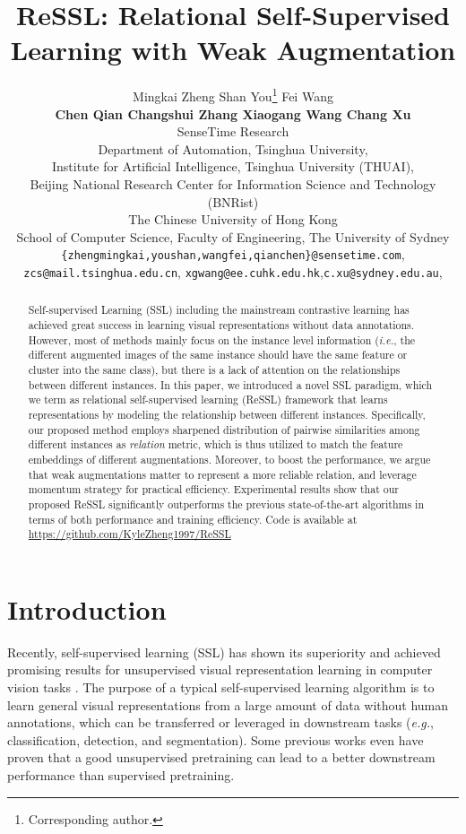 \documentclass{article}
\title{ReSSL: Relational Self-Supervised Learning with Weak Augmentation}
\author{Mingkai Zheng \quad Shan You\thanks{Corresponding author.}  \quad Fei Wang\\
	 \textbf{Chen Qian \quad Changshui Zhang \quad Xiaogang Wang \quad Chang Xu}\\
	SenseTime Research\\
	 Department of Automation, Tsinghua University,\\
Institute for Artificial Intelligence, Tsinghua University (THUAI), \\
Beijing National Research Center for Information Science and Technology (BNRist)\\
	 The Chinese University of Hong Kong\\
	School of Computer Science, Faculty of Engineering, The University of Sydney\\
	 \texttt{\{zhengmingkai,youshan,wangfei,qianchen\}@sensetime.com}, \\
 \texttt{zcs@mail.tsinghua.edu.cn}, \texttt{xgwang@ee.cuhk.edu.hk},\texttt{c.xu@sydney.edu.au},\\ 
	
}
\newcommand{\<}{\left\langle}
\renewcommand{\>}{\right\rangle}
\newcommand{\eg}{{\emph{e.g.}}}
\newcommand{\ie}{{\emph{i.e.}}}
\begin{document}
\maketitle

\vspace{-10pt}
\begin{abstract}
\vspace{-10pt}


Self-supervised Learning (SSL) including the mainstream contrastive learning has achieved great success in learning visual representations without data annotations. However, most of methods mainly focus on the instance level information (\ie, the different augmented images of the same instance should have the same feature or cluster into the same class), but there is a lack of attention on the relationships between different instances. In this paper, we introduced a novel SSL paradigm, which we term as relational self-supervised learning  (ReSSL) framework that learns representations by modeling the relationship between different instances. Specifically, our proposed method employs sharpened distribution of pairwise similarities among different instances as \textit{relation} metric, which is thus utilized to match the feature embeddings of different augmentations. Moreover, to boost the performance, we argue that weak augmentations matter to represent a more reliable relation, and leverage momentum strategy for practical efficiency. Experimental results show that our proposed ReSSL significantly outperforms the previous state-of-the-art algorithms in terms of both performance and training efficiency. Code is available at \href{https://github.com/KyleZheng1997/ReSSL}{https://github.com/KyleZheng1997/ReSSL}



\end{abstract}

\section{Introduction}

Recently, self-supervised learning (SSL) has shown its superiority and achieved promising results for unsupervised visual representation learning in computer vision tasks \cite{cmc, deepinfomax, cpc, simclr, SimSiam, instance_discrimination, byol, moco}. The purpose of a typical self-supervised learning algorithm is to learn general visual representations from a large amount of data without human annotations, which can be transferred or leveraged in downstream tasks (\eg, classification, detection, and segmentation). Some previous works \cite{swav, byol} even have proven that a good unsupervised pretraining can lead to a better downstream performance than supervised pretraining.  
\end{document}
